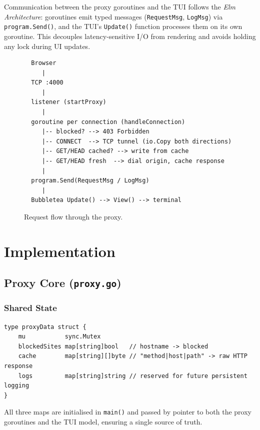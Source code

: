 \documentclass[11pt,a4paper]{article}
\begin{document}
Communication between the proxy goroutines and the TUI follows the
\emph{Elm Architecture}: goroutines emit typed messages (\texttt{RequestMsg},
\texttt{LogMsg}) via \texttt{program.Send()}, and the TUI's \texttt{Update()}
function processes them on its own goroutine. This decouples latency-sensitive
I/O from rendering and avoids holding any lock during UI updates.

\begin{figure}[h]
\centering
\begin{verbatim}
  Browser
     |
  TCP :4000
     |
  listener (startProxy)
     |
  goroutine per connection (handleConnection)
     |-- blocked? --> 403 Forbidden
     |-- CONNECT  --> TCP tunnel (io.Copy both directions)
     |-- GET/HEAD cached? --> write from cache
     |-- GET/HEAD fresh  --> dial origin, cache response
     |
  program.Send(RequestMsg / LogMsg)
     |
  Bubbletea Update() --> View() --> terminal
\end{verbatim}
\caption{Request flow through the proxy.}
\end{figure}

\section{Implementation}

\subsection{Proxy Core (\texttt{proxy.go})}

\subsubsection{Shared State}

\begin{lstlisting}[caption={Shared proxy state structure.}]
type proxyData struct {
    mu           sync.Mutex
    blockedSites map[string]bool   // hostname -> blocked
    cache        map[string][]byte // "method|host|path" -> raw HTTP response
    logs         map[string]string // reserved for future persistent logging
}
\end{lstlisting}

All three maps are initialised in \texttt{main()} and passed by pointer to
both the proxy goroutines and the TUI model, ensuring a single source of truth.
\end{document}
